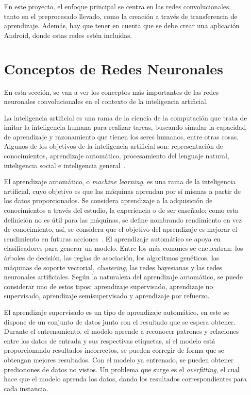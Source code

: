 
En este proyecto, el enfoque principal se centra en las redes convolucionales, tanto en el preprocesado llevado, como la creación a través de transferencia de aprendizaje. Además, hay que tener en cuenta que se debe crear una aplicación Android, donde estas redes estén incluidas.

\section{Conceptos de Redes Neuronales}

    En esta sección, se van a ver los conceptos más importantes de las redes neuronales convolucionales en el contexto de la inteligencia artificial.

    La inteligencia artificial es una rama de la ciencia de la computación que trata de imitar la inteligencia humana para realizar tareas, buscando simular la capacidad de aprendizaje y razonamiento que tienen los seres humanos, entre otras cosas. Algunos de los objetivos de la inteligencia artificial son: representación de conocimientos, aprendizaje automático, procesamiento del lenguaje natural, inteligencia social e inteligencia general~\cite{definicion_artificial_intelligence}.

    El aprendizaje automático, o \textit{machine learning}, es una rama de la inteligencia artificial, cuyo objetivo es que las máquinas aprendan por sí mismas a partir de los datos proporcionados. Se considera aprendizaje a la adquisición de conocimientos a través del estudio, la  experiencia o de ser enseñado; como esta definición no es útil para las máquinas, se define nombrando rendimiento en vez de conocimiento, así, se considera que el objetivo del aprendizaje es mejorar el rendimiento en futuras acciones~\cite{machine-learning}.
    El aprendizaje automático se apoya en clasificadores para generar un modelo. Entre los más comunes se encuentran: los árboles de decisión, las reglas de asociación, los algoritmos genéticos, las máquinas de soporte vectorial, \textit{clustering}, las redes bayesianas y las redes neuronales artificiales.
    Según la naturaleza del aprendizaje automático, se puede considerar uno de estos tipos: aprendizaje supervisado, aprendizaje no supervisado, aprendizaje semisupervisado y aprendizaje por refuerzo.
    
    El aprendizaje supervisado es un tipo de aprendizaje automático, en este se dispone de un conjunto de datos junto con el resultado que se espera obtener. Durante el entrenamiento, el modelo aprende a reconocer patrones y relaciones entre los datos de entrada y sus respectivas etiquetas, si el modelo está proporcionando resultados incorrectos, se pueden corregir de forma que se obtengan mejores resultados. Con el modelo ya entrenado, se pueden obtener predicciones de datos no vistos. Un problema que surge es el \textit{overfitting}, el cual hace que el modelo aprenda los datos, dando los resultados correspondientes para cada instancia.

